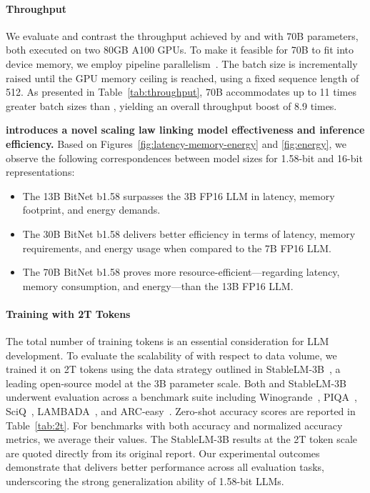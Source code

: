 \paragraph{Throughput}

We evaluate and contrast the throughput achieved by  and  with 70B parameters, both executed on two 80GB A100 GPUs. To make it feasible for  70B to fit into device memory, we employ pipeline parallelism~\cite{gpipe}. The batch size is incrementally raised until the GPU memory ceiling is reached, using a fixed sequence length of 512. As presented in Table~\ref{tab:throughput},  70B accommodates up to 11 times greater batch sizes than , yielding an overall throughput boost of 8.9 times.

\textbf{ introduces a novel scaling law linking model effectiveness and inference efficiency.} Based on Figures~\ref{fig:latency-memory-energy} and \ref{fig:energy}, we observe the following correspondences between model sizes for 1.58-bit and 16-bit representations:

\begin{itemize}
    \item The 13B BitNet b1.58 surpasses the 3B FP16 LLM in latency, memory footprint, and energy demands.
    \item The 30B BitNet b1.58 delivers better efficiency in terms of latency, memory requirements, and energy usage when compared to the 7B FP16 LLM.
    \item The 70B BitNet b1.58 proves more resource-efficient—regarding latency, memory consumption, and energy—than the 13B FP16 LLM.
\end{itemize}

\paragraph{Training with 2T Tokens}

The total number of training tokens is an essential consideration for LLM development. To evaluate the scalability of  with respect to data volume, we trained it on 2T tokens using the data strategy outlined in StableLM-3B~\cite{StableLM-3B-4E1T}, a leading open-source model at the 3B parameter scale. Both  and StableLM-3B underwent evaluation across a benchmark suite including Winogrande~\cite{winoGrande}, PIQA~\cite{piqa}, SciQ~\cite{sciq}, LAMBADA~\cite{lambada}, and ARC-easy~\cite{arc}. Zero-shot accuracy scores are reported in Table~\ref{tab:2t}. For benchmarks with both accuracy and normalized accuracy metrics, we average their values. The StableLM-3B results at the 2T token scale are quoted directly from its original report. Our experimental outcomes demonstrate that  delivers better performance across all evaluation tasks, underscoring the strong generalization ability of 1.58-bit LLMs.

